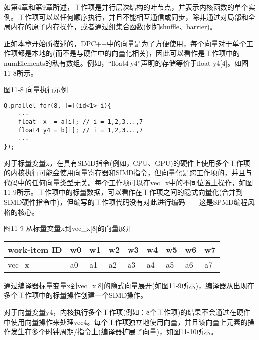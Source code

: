 如第4章和第9章所述，工作项是并行层次结构的叶节点，并表示内核函数的单个实例。工作项可以以任何顺序执行，并且不能相互通信或同步，除非通过对局部和全局内存的原子内存操作，或者通过组集合函数(例如shuffle、barrier)。\par

正如本章开始所描述的，DPC++中的向量是为了方便使用，每个向量对于单个工作项都是本地的(而不是与硬件中的向量化相关)，因此可以看作是工作项中的numElements的私有数组。例如，“float4 y4”声明的存储等价于float y4[4]。如图11-8所示。\par

\hspace*{\fill} \par %
图11-8 向量执行示例
\begin{lstlisting}[caption={}]
Q.prallel_for(8, [=](id<1> i){
	...
	float  x  = a[i]; // i = 1,2,3...,7
	float4 y4 = b[i]; // i = 1,2,3...,7
	...
});
\end{lstlisting}

对于标量变量x，在具有SIMD指令(例如，CPU、GPU)的硬件上使用多个工作项的内核执行可能会使用向量寄存器和SIMD指令，但向量化是跨工作项的，并且与代码中的任何向量类型无关。每个工作项可以在vec\_x中的不同位置上操作，如图11-9所示。工作项中的标量数据，可以看作在工作项之间的隐式向量化(合并到SIMD硬件指令中)，但编写的工作项代码没有对此进行编码——这是SPMD编程风格的核心。

\hspace*{\fill} \par %
图11-9 从标量变量x到vec\_x[8]的向量展开
\begin{table}[H]
	\begin{tabular}{|l|l|l|l|l|l|l|l|l|}
		\hline
		work-item ID & w0 & w1 & w2 & w3 & w4 & w5 & w6 & w7 \\ \hline
		vec\_x       & a0 & a1 & a2 & a3 & a4 & a5 & a6 & a7 \\ \hline
	\end{tabular}
\end{table}

通过编译器标量变量x到vec\_x[8]的隐式向量展开(如图11-9所示)，编译器从出现在多个工作项中的标量操作创建一个SIMD操作。\par

对于向量变量y4，内核执行多个工作项(例如：8个工作项)的结果不会通过在硬件中使用向量操作来处理vec4。每个工作项独立地使用向量，并且该向量上元素的操作发生在多个时钟周期/指令上(编译器扩展了向量)，如图11-10所示。\par

